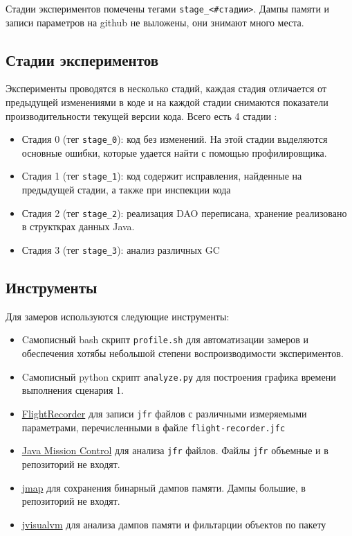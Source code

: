 \documentclass{article}
\begin{document}
		Стадии экспериментов помечены тегами \texttt{stage\_<\#стадии>}. Дампы памяти и записи параметров на github не выложены, они знимают много места.


	\subsection*{Стадии экспериментов}
		Эксперименты проводятся в несколько стадий, каждая стадия отличается от предыдущей изменениями в коде и на каждой стадии снимаются показатели производительности текущей версии кода. Всего есть 4 стадии :
		\begin{itemize}
			\item  Стадия 0 (тег \texttt{stage\_0}): код без изменений. На этой стадии выделяются основные ошибки, которые удается найти с помощью профилировщика.
			\item Стадия 1 (тег \texttt{stage\_1}): код содержит исправления, найденные на предыдущей стадии, а также при инспекции кода
			\item Стадия 2 (тег \texttt{stage\_2}): реализация DAO переписана, хранение реализовано в структкрах данных Java.
			\item Стадия 3 (тег \texttt{stage\_3}): анализ различных GC
		\end{itemize}

	\subsection*{Инструменты}
		Для замеров используются следующие инструменты:
		\begin{itemize}
			\item Cамописный bash скрипт \texttt{profile.sh} для автоматизации замеров и обеспечения хотябы небольшой степени воспроизводимости экспериментов.
			\item Cамописный python скрипт \texttt{analyze.py} для построения графика времени выполнения сценария 1.
			\item \href{https://docs.oracle.com/javacomponents/jmc-5-5/jfr-runtime-guide/about.html}{FlightRecorder} для записи \texttt{jfr} файлов с различными измеряемыми параметрами, перечисленными в файле \texttt{flight-recorder.jfc}
			\item \href{https://www.oracle.com/technetwork/java/javaseproducts/mission-control/index.html}{Java Mission Control} для анализа \texttt{jfr} файлов. Файлы \texttt{jfr} объемные и в репозиторий не входят.
			\item \href{https://docs.oracle.com/javase/8/docs/technotes/tools/unix/jmap.html}{jmap} для сохранения бинарный дампов памяти. Дампы большие, в репозиторий не входят.
			\item \href{https://docs.oracle.com/javase/8/docs/technotes/guides/visualvm/index.html}{jvisualvm} для анализа дампов памяти и фильтарции объектов по пакету
		\end{itemize}
	
\end{document}
